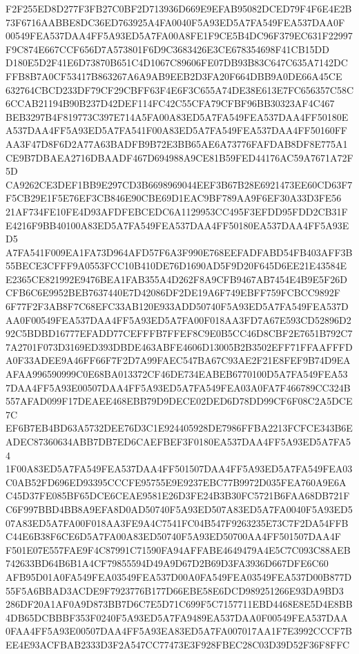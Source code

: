 \documentclass[UTF8,fontset=fandol,zihao=-4,a4paper]{ctexart}
\begin{document}
{{F2F255ED8D277F3FB27C0BF2D713936D669E9EFAB95082DCED79F4F6E4E2B73F6716AABBE8DC36ED763925A4FA0040F5A93ED5A7FA549FEA537DAA0F
00549FEA537DAA4FF5A93ED5A7FA00A8FE1F9CE5B4DC96F379EC631F22997F9C874E667CCF656D7A573801F6D9C3683426E3CE678354698F41CB15DD
D180E5D2F41E6D73870B651C4D1067C89606FE07DB93B83C647C635A7142DCFFB8B7A0CF53417B863267A6A9AB9EEB2D3FA20F664DBB9A0DE66A45CE
632764CBCD233DF79CF29CBFF63F4E6F3C655A74DE38E613E7FC656357C58C6CCAB21194B90B237D42DEF114FC42C55CFA79CFBF96BB30323AF4C467
BEB3297B4F819773C397E714A5FA00A83ED5A7FA549FEA537DAA4FF50180EA537DAA4FF5A93ED5A7FA541F00A83ED5A7FA549FEA537DAA4FF50160FF
AA3F47D8F6D2A77A63BADFB9B72E3BB65AE6A73776FAFDAB8DF8E775A1CE9B7DBAEA2716DBAADF467D694988A9CE81B59FED44176AC59A7671A72F5D
CA9262CE3DEF1BB9E297CD3B6698969044EEF3B67B28E6921473EE60CD63F7F5CB29E1F5E76EF3CB846E90CBE69D1EAC9BF789AA9F6EF30A33D3FE56
21AF734FE10FE4D93AFDFEBCEDC6A1129953CC495F3EFDD95FDD2CB31FE4216F9BB40100A83ED5A7FA549FEA537DAA4FF50180EA537DAA4FF5A93ED5
A7FA541F009EA1FA73D964AFD57F6A3F990E768EEFADFABD54FB403AFF3B55BECE3CFFF9A0553FCC10B410DE76D1690AD5F9D20F645D6EE21E43584E
E2365CE821992E9476BEA1FAB355A4D262F8A9CFB9467AB7454E4B9E5F26DCFB6C6E9952BEB7637440E7D42086DF2DE19A6F749EBFF759FCBCC9892F
6F77F2F3AB8F7C68EFC33AB120E933ADD50740F5A93ED5A7FA549FEA537DAA0F00549FEA537DAA4FF5A93ED5A7FA00F018AA3FD7A67E593CD52896D2
92C5BDBD16777EFADD77CEFFFB7FFEF8C9E0B5CC46D8CBF2E7651B792C77A2701F073D3169ED393DBDE463ABFE4606D13005B2B3502EFF71FFAAFFFD
A0F33ADEE9A46FF66F7F2D7A99FAEC547BA67C93AE2F21E8FEF9B74D9EAAFAA996590999C0E68BA013372CF46DE734EABEB6770100D5A7FA549FEA53
7DAA4FF5A93E00507DAA4FF5A93ED5A7FA549FEA03A0FA7F466789CC324B557AFAD099F17DEAEE468EBB79D9DECE02DED6D78DD99CF6F08C2A5DCE7C
EF6B7EB4BD63A5732DEE76D3C1E924405928DE7986FFBA2213FCFCE343B6EADEC87360634ABB7DB7ED6CAEFBEF3F0180EA537DAA4FF5A93ED5A7FA54
1F00A83ED5A7FA549FEA537DAA4FF501507DAA4FF5A93ED5A7FA549FEA03C0AB52FD696ED93395CCCFE95755E9E9237EBC77B9972D035FEA760A9E6A
C45D37FE085BF65DCE6CEAE9581E26D3FE24B3B30FC5721B6FAA68DB721FC6F997BBD4BB8A9EFA8D0AD50740F5A93ED507A83ED5A7FA0040F5A93ED5
07A83ED5A7FA00F018AA3FE9A4C7541FC04B547F9263235E73C7F2DA54FFBC44E6B38F6CE6D5A7FA00A83ED50740F5A93ED50700AA4FF501507DAA4F
F501E07E557FAE9F4C87991C71590FA94AFFABE4649479A4E5C7C093C88AEB742633BD64B6B1A4CF79855594D49A9D67D2B69D3FA3936D667DFE6C60
AFB95D01A0FA549FEA03549FEA537D00A0FA549FEA03549FEA537D00B877D55F5A6BBAD3ACDE9F7923776B177D66EBE58E6DCD989251266E93DA9BD3
286DF20A1AF0A9D873BB7D6C7E5D71C699F5C7157711EBD4468E8E5D4E8BB4DB65DCBBBF353F0240F5A93ED5A7FA9489EA537DAA0F00549FEA537DAA
0FAA4FF5A93E00507DAA4FF5A93EA83ED5A7FA007017AA1F7E3992CCCF7BEE4E93ACFBAB2333D3F2A547CC77473E3F928FBEC28C03D39D52F36F8FFC
}}
\end{document}

